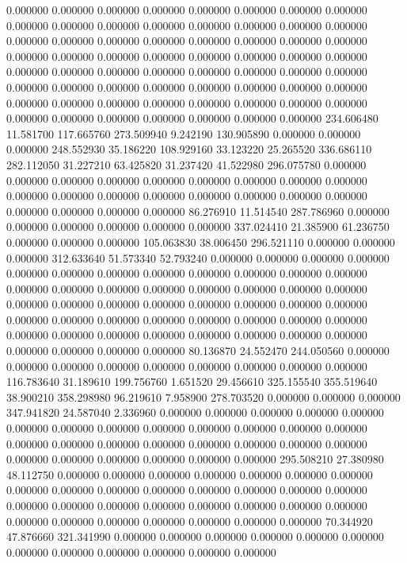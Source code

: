 0.000000 0.000000 0.000000
0.000000 0.000000 0.000000
0.000000 0.000000 0.000000
0.000000 0.000000 0.000000
0.000000 0.000000 0.000000
0.000000 0.000000 0.000000
0.000000 0.000000 0.000000
0.000000 0.000000 0.000000
0.000000 0.000000 0.000000
0.000000 0.000000 0.000000
0.000000 0.000000 0.000000
0.000000 0.000000 0.000000
0.000000 0.000000 0.000000
0.000000 0.000000 0.000000
0.000000 0.000000 0.000000
0.000000 0.000000 0.000000
0.000000 0.000000 0.000000
0.000000 0.000000 0.000000
0.000000 0.000000 0.000000
0.000000 0.000000 0.000000
0.000000 0.000000 0.000000
234.606480 11.581700 117.665760
273.509940 9.242190 130.905890
0.000000 0.000000 0.000000
248.552930 35.186220 108.929160
33.123220 25.265520 336.686110
282.112050 31.227210 63.425820
31.237420 41.522980 296.075780
0.000000 0.000000 0.000000
0.000000 0.000000 0.000000
0.000000 0.000000 0.000000
0.000000 0.000000 0.000000
0.000000 0.000000 0.000000
0.000000 0.000000 0.000000
0.000000 0.000000 0.000000
86.276910 11.514540 287.786960
0.000000 0.000000 0.000000
0.000000 0.000000 0.000000
337.024410 21.385900 61.236750
0.000000 0.000000 0.000000
105.063830 38.006450 296.521110
0.000000 0.000000 0.000000
312.633640 51.573340 52.793240
0.000000 0.000000 0.000000
0.000000 0.000000 0.000000
0.000000 0.000000 0.000000
0.000000 0.000000 0.000000
0.000000 0.000000 0.000000
0.000000 0.000000 0.000000
0.000000 0.000000 0.000000
0.000000 0.000000 0.000000
0.000000 0.000000 0.000000
0.000000 0.000000 0.000000
0.000000 0.000000 0.000000
0.000000 0.000000 0.000000
0.000000 0.000000 0.000000
0.000000 0.000000 0.000000
0.000000 0.000000 0.000000
0.000000 0.000000 0.000000
80.136870 24.552470 244.050560
0.000000 0.000000 0.000000
0.000000 0.000000 0.000000
0.000000 0.000000 0.000000
116.783640 31.189610 199.756760
1.651520 29.456610 325.155540
355.519640 38.900210 358.298980
96.219610 7.958900 278.703520
0.000000 0.000000 0.000000
347.941820 24.587040 2.336960
0.000000 0.000000 0.000000
0.000000 0.000000 0.000000
0.000000 0.000000 0.000000
0.000000 0.000000 0.000000
0.000000 0.000000 0.000000
0.000000 0.000000 0.000000
0.000000 0.000000 0.000000
0.000000 0.000000 0.000000
0.000000 0.000000 0.000000
295.508210 27.380980 48.112750
0.000000 0.000000 0.000000
0.000000 0.000000 0.000000
0.000000 0.000000 0.000000
0.000000 0.000000 0.000000
0.000000 0.000000 0.000000
0.000000 0.000000 0.000000
0.000000 0.000000 0.000000
0.000000 0.000000 0.000000
0.000000 0.000000 0.000000
0.000000 0.000000 0.000000
70.344920 47.876660 321.341990
0.000000 0.000000 0.000000
0.000000 0.000000 0.000000
0.000000 0.000000 0.000000
0.000000 0.000000 0.000000
